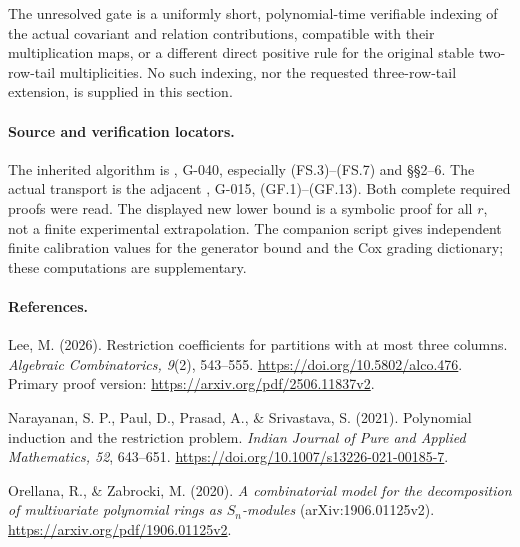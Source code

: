 The unresolved gate is a uniformly short, polynomial-time
verifiable indexing of the actual covariant and relation
contributions, compatible with their multiplication maps, or a
different direct positive rule for the original stable
two-row-tail multiplicities.  No such indexing, nor the
requested three-row-tail extension, is supplied in this section.

\paragraph{Source and verification locators.}
The inherited algorithm is
,
G-040, especially (FS.3)--(FS.7) and \S\S2--6.
The actual transport is the adjacent
, G-015, (GF.1)--(GF.13).
Both complete required proofs were read.  The displayed new
lower bound is a symbolic proof for all $r$, not a finite
experimental extrapolation.  The companion script
 gives independent
finite calibration values for the generator bound and the
Cox grading dictionary; these computations are supplementary.

\paragraph{References.}
Lee, M. (2026). Restriction coefficients for partitions with at
most three columns. \emph{Algebraic Combinatorics, 9}(2),
543--555. \url{https://doi.org/10.5802/alco.476}.
Primary proof version: \url{https://arxiv.org/pdf/2506.11837v2}.

Narayanan, S. P., Paul, D., Prasad, A., \& Srivastava, S.
(2021). Polynomial induction and the restriction problem.
\emph{Indian Journal of Pure and Applied Mathematics, 52},
643--651. \url{https://doi.org/10.1007/s13226-021-00185-7}.

Orellana, R., \& Zabrocki, M. (2020).
\emph{A combinatorial model for the decomposition of multivariate
polynomial rings as $S_n$-modules} (arXiv:1906.01125v2).
\url{https://arxiv.org/pdf/1906.01125v2}.
